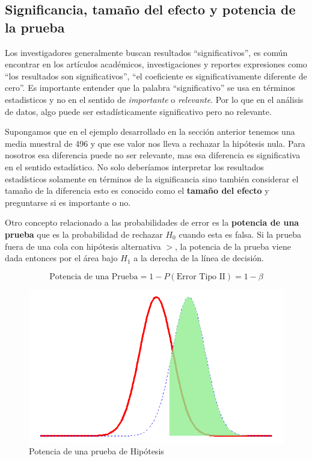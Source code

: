 \documentclass[letterpaper,]{book}
\begin{document}
\hypertarget{significancia-tamano-del-efecto-y-potencia-de-la-prueba}{%
\subsection{Significancia, tamaño del efecto y potencia de la prueba}\label{significancia-tamano-del-efecto-y-potencia-de-la-prueba}}

Los investigadores generalmente buscan resultados ``significativos'', es común encontrar en los artículos académicos, investigaciones y reportes expresiones como ``los resultados son significativos'', ``el coeficiente es significativamente diferente de cero''. Es importante entender que la palabra ``significativo'' se usa en términos estadisticos y no en el sentido de \emph{importante} o \emph{relevante}. Por lo que en el análisis de datos, algo puede ser estadísticamente significativo pero no relevante.

Supongamos que en el ejemplo desarrollado en la sección anterior tenemos una media muestral de 496 y que ese valor nos lleva a rechazar la hipótesis nula. Para nosotros esa diferencia puede no ser relevante, mas esa diferencia es significativa en el sentido estadístico. No solo deberíamos interpretar los resultados estadísticos solamente en términos de la significancia sino también considerar el tamaño de la diferencia esto es conocido como el \textbf{tamaño del efecto} y preguntarse si es importante o no.

Otro concepto relacionado a las probabilidades de error es la \textbf{potencia de una prueba} que es la probabilidad de rechazar \(H_0\) cuando esta es falsa. Si la prueba fuera de una cola con hipótesis alternativa \(>\), la potencia de la prueba viene dada entonces por el área bajo \(H_1\) a la derecha de la línea de decisión.

\begin{equation} 
\text{Potencia de una Prueba}=1-P\left(\text{Error Tipo II}\right)=1-\beta
\label{eq:power}
\end{equation}

\begin{figure}[h!]

{\centering \includegraphics[width=0.6\linewidth]{power} 

}

\caption{Potencia de una prueba de Hipótesis}\label{fig:power}
\end{figure}
\end{document}
